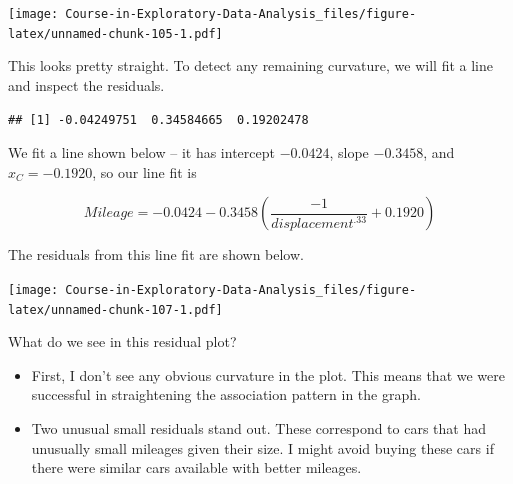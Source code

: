 \documentclass[
]{book}
\newenvironment{Shaded}{\begin{snugshade}}{\end{snugshade}}
\newcommand{\AttributeTok}[1]{\textcolor[rgb]{0.77,0.63,0.00}{#1}}
\newcommand{\DecValTok}[1]{\textcolor[rgb]{0.00,0.00,0.81}{#1}}
\newcommand{\FunctionTok}[1]{\textcolor[rgb]{0.00,0.00,0.00}{#1}}
\newcommand{\NormalTok}[1]{#1}
\newcommand{\OtherTok}[1]{\textcolor[rgb]{0.56,0.35,0.01}{#1}}
\newcommand{\SpecialCharTok}[1]{\textcolor[rgb]{0.00,0.00,0.00}{#1}}
\providecommand{\tightlist}{%
  \setlength{\itemsep}{0pt}\setlength{\parskip}{0pt}}
\begin{document}
\texttt{[image: Course-in-Exploratory-Data-Analysis\_files/figure-latex/unnamed-chunk-105-1.pdf]}

This looks pretty straight. To detect any remaining curvature, we will fit a line and inspect the residuals.

\begin{Shaded}
\end{Shaded}

\begin{verbatim}
## [1] -0.04249751  0.34584665  0.19202478
\end{verbatim}

We fit a line shown below -- it has intercept \(-0.0424\), slope \(-0.3458\), and \(x_C = -0.1920\), so our line fit is

\[
Mileage  = -0.0424 - 0.3458 \left(\frac{-1}{displacement^{.33}} + 0.1920\right)
\]

The residuals from this line fit are shown below.

\begin{Shaded}
\end{Shaded}

\texttt{[image: Course-in-Exploratory-Data-Analysis\_files/figure-latex/unnamed-chunk-107-1.pdf]}

What do we see in this residual plot?

\begin{itemize}
\tightlist
\item
  First, I don't see any obvious curvature in the plot. This means that we were successful in straightening the association pattern in the graph.
\item
  Two unusual small residuals stand out. These correspond to cars that had unusually small mileages given their size. I might avoid buying these cars if there were similar cars available with better mileages.
\end{itemize}
\end{document}
